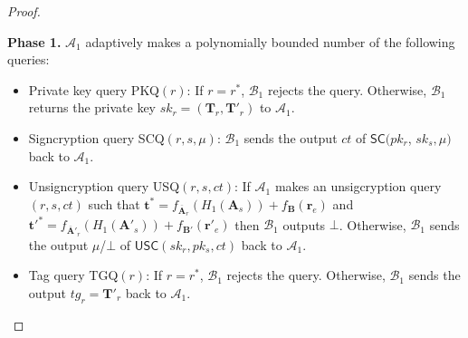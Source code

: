 \documentclass[a4paper,11pt,onecolumn]{elsarticle}
\begin{document}
\begin{proof}
\begin{description}
			  \textbf{Phase 1.}  $\mathcal{A}_1$ adaptively makes a polynomially bounded number of the following queries:
			\begin{itemize}
		\item Private key query  PKQ$(r)$: If $r=r^*$, $\mathcal{B}_1$ rejects the query. Otherwise, $\mathcal{B}_1$   returns the private key $sk_{r}=(\textbf{T}_r, \textbf{T}'_r)$  to $\mathcal{A}_1$. 
		\item Signcryption query SCQ$(r,s,\mu)$: $\mathcal{B}_1$ sends the output $ct$ of $\textsf{SC}(pk_{r}$, $sk_{s},\mu)$ back to $\mathcal{A}_1$.
		\item Unsigncryption query   USQ$(r,s,ct)$: If  $\mathcal{A}_1$ makes an unsigcryption query  $(r, s,ct)$ such that $\textbf{t}^*=f_{\overline{\textbf{A}}_r}(H_1(\textbf{A}_s))+f_{\textbf{B}}(\textbf{r}_e)$ and $\textbf{t}'^*=f_{\overline{\textbf{A}}'_r}(H_1(\textbf{A}'_s))+f_{\textbf{B}'}(\textbf{r}'_e)$ then  $\mathcal{B}_1$ outputs $\bot$. Otherwise, $\mathcal{B}_1$ sends the output $\mu$/$\bot$ of $\textsf{USC}(sk_{r},pk_{s},ct)$ back to $\mathcal{A}_1$. 
		\item Tag query TGQ$(r)$: If $r=r^*$, $\mathcal{B}_1$ rejects the query. Otherwise, $\mathcal{B}_1$ sends the output $tg_{r}=\textbf{T}'_r$ back to $\mathcal{A}_1$. 
			\end{itemize}
			 				

\end{description}
\end{proof}
\end{document}
